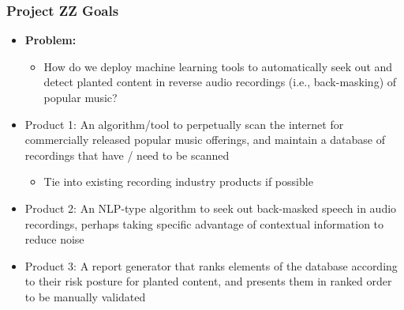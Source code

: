 
\begin{frame}
        \frametitle{\textcolor{Mahogany}{Project ZZ Goals}}
        \begin{itemize}
        	\item \textbf{Problem:} 
			\begin{itemize} 
				\item How do we deploy machine learning tools to automatically seek out and detect planted content in reverse audio recordings (i.e., back-masking) of popular music?
			\end{itemize}
			\item Product 1: An algorithm/tool to perpetually scan the internet for commercially released popular music offerings, and maintain a database of recordings that have / need to be scanned
			\begin{itemize}
				\item Tie into existing recording industry products if possible
			\end{itemize}
			\item Product 2: An NLP-type algorithm to seek out back-masked speech in audio recordings, perhaps taking specific advantage of contextual information to reduce noise
			\item Product 3: A report generator that ranks elements of the database according to their risk posture for planted content, and presents them in ranked order to be manually validated
		\end{itemize}

    \end{frame}